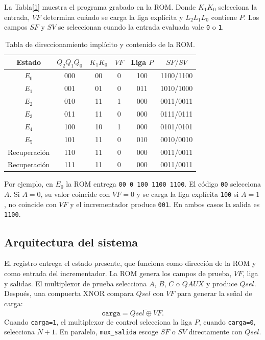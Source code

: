 \documentclass[letterpaper,12pt]{article}
\begin{document}
La Tabla[\ref{tab:memoria}] muestra el programa grabado en la ROM. Donde $K_1K_0$ selecciona la entrada, $VF$ determina cuándo se carga la liga explícita y $L_2L_1L_0$ contiene $P$. Los campos $SF$ y $SV$ se seleccionan cuando la entrada evaluada vale \texttt{0} o \texttt{1}.

\begin{table}[H]
\centering
\scriptsize
\caption{Tabla de direccionamiento implícito y contenido de la ROM.}
\label{tab:memoria}
\begin{tabular}{c c c c c c}
\toprule
Estado & $Q_2Q_1Q_0$ & $K_1K_0$ & $VF$ & Liga $P$ & $SF/SV$\\
\midrule
$E_0$ & 000 & 00 & 0 & 100 & 1100/1100\\
$E_1$ & 001 & 01 & 0 & 011 & 1010/1000\\
$E_2$ & 010 & 11 & 1 & 000 & 0011/0011\\
$E_3$ & 011 & 11 & 0 & 000 & 0111/0111\\
$E_4$ & 100 & 10 & 1 & 000 & 0101/0101\\
$E_5$ & 101 & 11 & 0 & 010 & 0010/0010\\
Recuperación & 110 & 11 & 0 & 000 & 0011/0011\\
Recuperación & 111 & 11 & 0 & 000 & 0011/0011\\
\bottomrule
\end{tabular}
\end{table}

Por ejemplo, en $E_0$ la ROM entrega \texttt{00 0 100 1100 1100}. El código \texttt{00} selecciona $A$. Si $A=0$, su valor coincide con $VF=0$ y se carga la liga explícita \texttt{100} si $A=1$, no coincide con $VF$ y el incrementador produce \texttt{001}. En ambos casos la salida es \texttt{1100}.

\subsection{Arquitectura del sistema}

El registro entrega el estado presente, que funciona como dirección de la ROM y como entrada del incrementador. La ROM genera los campos de prueba, $VF$, liga y salidas. El multiplexor de prueba selecciona $A$, $B$, $C$ o $QAUX$ y produce $Qsel$. Después, una compuerta XNOR compara $Qsel$ con $VF$ para generar la señal de carga:
\[
\texttt{carga}=\overline{Qsel\oplus VF}.
\]
Cuando \texttt{carga=1}, el multiplexor de control selecciona la liga $P$, cuando \texttt{carga=0}, selecciona $N+1$. En paralelo, \texttt{mux\_salida} escoge $SF$ o $SV$ directamente con $Qsel$.
\end{document}

